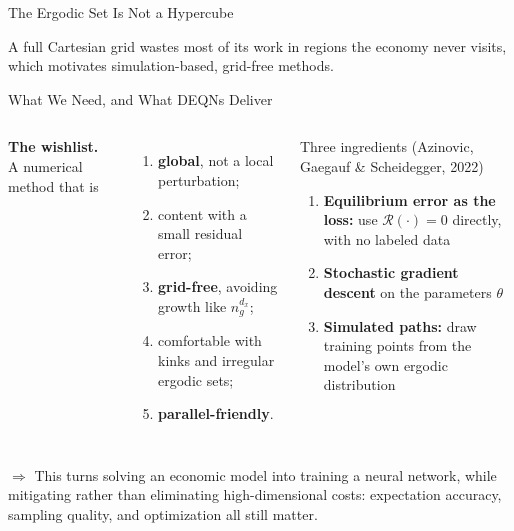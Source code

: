 \documentclass[aspectratio=169,11pt]{beamer}
\newcommand{\emphc}[1]{\textcolor{harvardcrimson}{#1}}
\newcommand{\param}{\theta}          %
\newcommand{\resid}{\mathcal{R}}     %
\begin{document}
\begin{frame}{The Ergodic Set Is Not a Hypercube}
\begin{center}
\end{center}

\begin{center}
{\footnotesize A full Cartesian grid \emphc{wastes} most of its work in regions the economy never visits, which motivates \emphc{simulation-based, grid-free} methods.}
\end{center}
\end{frame}

\begin{frame}{What We Need, and What DEQNs Deliver}
\begin{columns}[T]
\textbf{The wishlist.} A numerical method that is
\begin{enumerate}
    \setlength{\itemsep}{2pt}
    \item \textbf{global}, not a local perturbation;
    \item content with a small residual error;
    \item \textbf{grid-free}, avoiding growth like $n_g^{d_x}$;
    \item comfortable with kinks and irregular ergodic sets;
    \item \textbf{parallel-friendly}.
\end{enumerate}

\begin{block}{Three ingredients (Azinovic, Gaegauf \& Scheidegger, 2022)}
\begin{enumerate}\itemsep2pt
    \item \textbf{Equilibrium error as the loss:} use $\resid(\cdot) = 0$ directly, with \emphc{no labeled data}
    \item \textbf{Stochastic gradient descent} on the parameters $\param$
    \item \textbf{Simulated paths:} draw training points from the model's own \emphc{ergodic distribution}
\end{enumerate}
\end{block}
\end{columns}

\vspace{0.4em}
\begin{center}
{\footnotesize $\Rightarrow$ This turns \emphc{solving} an economic model into \emphc{training} a neural network, while \emphc{mitigating} rather than eliminating high-dimensional costs: expectation accuracy, sampling quality, and optimization all still matter.}
\end{center}
\end{frame}
\end{document}
